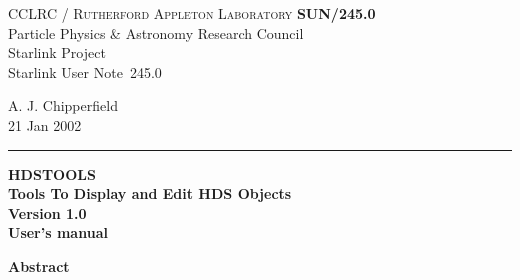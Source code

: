 \documentclass[twoside,11pt]{article}
\newcommand{\stardoccategory}  {Starlink User Note}
\newcommand{\stardocinitials}  {SUN}
\newcommand{\stardocnumber}    {245.0}
\newcommand{\stardocauthors}   {A. J. Chipperfield}
\newcommand{\stardocdate}      {21 Jan 2002}
\newcommand{\stardoctitle}     {HDSTOOLS\\Tools To Display and Edit HDS Objects}
\newcommand{\stardocversion}   {Version 1.0}
\newcommand{\stardocmanual}    {User's manual}
\newcommand{\stardocname}{\stardocinitials /\stardocnumber}
\newenvironment{latexonly}{}{}
\renewcommand{\_}{\texttt{\symbol{95}}}
\begin{document}
\thispagestyle{empty}

\begin{latexonly}
   CCLRC / \textsc{Rutherford Appleton Laboratory} \hfill \textbf{\stardocname}\\
   {\large Particle Physics \& Astronomy Research Council}\\
   {\large Starlink Project\\}
   {\large \stardoccategory\ \stardocnumber}
   \begin{flushright}
   \stardocauthors\\
   \stardocdate
   \end{flushright}
   \vspace{-4mm}
   \rule{\textwidth}{0.5mm}
   \vspace{5mm}
   \begin{center}
   {\Huge\textbf{\stardoctitle \\ [2.5ex]}}
   {\LARGE\textbf{\stardocversion \\ [4ex]}}
   {\Huge\textbf{\stardocmanual}}
   \end{center}
   \vspace{5mm}


   \vspace{10mm}
   \begin{center}
      {\Large\textbf{Abstract}}
   \end{center}
\end{latexonly}
\end{document}
